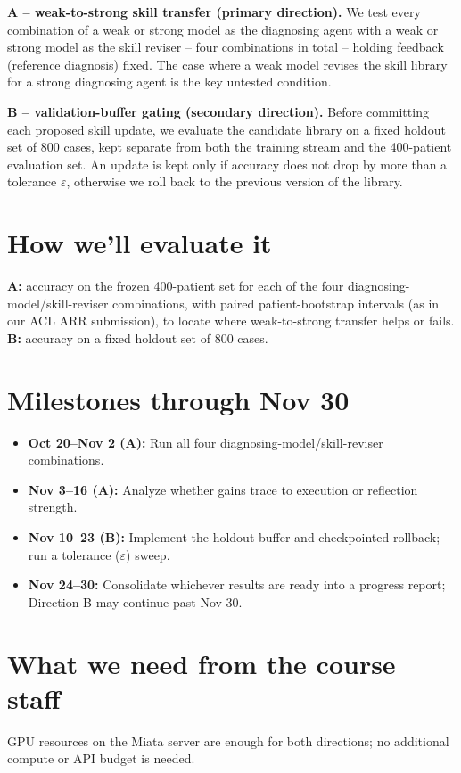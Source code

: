 \documentclass[10pt]{article}
\begin{document}
\textbf{A -- weak-to-strong skill transfer (primary direction).} We test every
combination of a weak or strong model as the diagnosing agent with a weak or strong model
as the skill reviser -- four combinations in total -- holding feedback (reference
diagnosis) fixed. The case where a weak model revises the skill library for a strong
diagnosing agent is the key untested condition.

\textbf{B -- validation-buffer gating (secondary direction).} Before committing each
proposed skill update, we evaluate the candidate library on a fixed holdout set of 800
cases, kept separate from both the training stream and the 400-patient evaluation set. An
update is kept only if accuracy does not drop by more than a tolerance $\varepsilon$,
otherwise we roll back to the previous version of the library.

\section*{How we'll evaluate it}
\textbf{A:} accuracy on the frozen 400-patient set for each of the four
diagnosing-model/skill-reviser combinations, with paired patient-bootstrap intervals (as
in our ACL ARR submission), to locate where weak-to-strong transfer helps or fails.
\textbf{B:} accuracy on a fixed holdout set of 800 cases.

\section*{Milestones through Nov 30}
\begin{itemize}
\item \textbf{Oct 20--Nov 2 (A):} Run all four diagnosing-model/skill-reviser combinations.
\item \textbf{Nov 3--16 (A):} Analyze whether gains trace to execution or reflection strength.
\item \textbf{Nov 10--23 (B):} Implement the holdout buffer and checkpointed rollback; run a tolerance ($\varepsilon$) sweep.
\item \textbf{Nov 24--30:} Consolidate whichever results are ready into a progress report; Direction B may continue past Nov 30.
\end{itemize}

\section*{What we need from the course staff}
GPU resources on the Miata server are enough for both directions; no additional compute
or API budget is needed.
\end{document}
